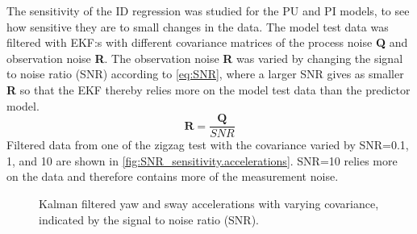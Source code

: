The sensitivity of the ID regression was studied for the PU and PI models, to see how sensitive they are to small changes in the data.
The model test data was filtered with EKF:s with different covariance matrices of the process noise \textbf{Q} and observation noise \textbf{R}. The observation noise \textbf{R} was varied by changing the signal to noise ratio (SNR) according to \autoref{eq:SNR}, where a larger SNR gives as smaller \textbf{R} so that the EKF thereby relies more on the model test data than the predictor model.
\begin{equation}
    \label{eq:SNR}
    \mathbf{R} = \frac{\mathbf{Q}}{SNR}
\end{equation}
Filtered data from one of the zigzag test with the covariance varied by SNR=0.1, 1, and 10 are shown in \autoref{fig:SNR_sensitivity.accelerations}. SNR=10 relies more on the data and therefore contains more of the measurement noise.
\begin{figure}[h]
    \begin{center}
        
        \caption{Kalman filtered yaw and sway accelerations with varying covariance, indicated by the signal to noise ratio (SNR).}
        \label{fig:SNR_sensitivity.accelerations}
    \end{center}
\end{figure}